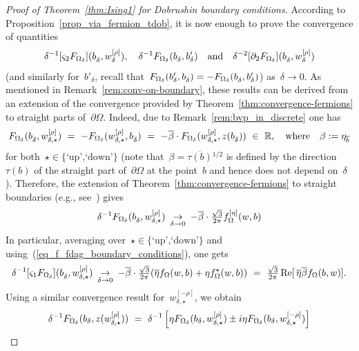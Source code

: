 \documentclass[reqno,11pt,a4paper]{amsart}
\theoremstyle{remark}
\newcommand{\R}{\mathbb{R}}
\newcommand{\weta}{w^{\left[\eta \right]}}
\newcommand{\wrho}{w^{\left[\rho \right]}}
\newcommand{\wmrho}{w^{\left[-\rho \right]}}
\newcommand{\feta}{f_{\Omega}^{[\eta]}}
\newcommand{\f}{f_{\Omega}}
\newcommand{\fstar}{f_{\Omega}^\star}
\newcommand{\dOne}{\partial_1}
\newcommand{\dTwo}{\partial_2}
\newcommand{\sOne}{\varsigma_1}
\newcommand{\sTwo}{\varsigma_2}
\renewcommand\Re{\operatorname{Re}}
\begin{document}
\begin{proof}[Proof of Theorem~\ref{thm:Ising1} for Dobrushin boundary conditions] According to Proposition~\ref{prop_via_fermion_tdob}, it is now enough to prove the convergence of quantities
\[
\delta^{-1}[\sTwo\Fdelta](b_\delta^{\vphantom{\rho}},\wrho_\delta),\quad \delta^{-1}\Fdelta(b^{\vphantom{\prime}}_\delta,b'_\delta)\quad\text{and}\quad
\delta^{-2}[\dTwo\Fdelta](b_\delta^{\vphantom{\rho}},\wrho_\delta)%
\]
(and similarly for~$b'_\delta$, recall that~$F_{\Omega_\delta}(b'_\delta,b^{\vphantom{\prime}}_\delta)=-F_{\Omega_\delta}(b^{\vphantom{\prime}}_\delta,b'_\delta)$) as~$\delta\to 0$. As mentioned in Remark~\ref{rem:conv-on-boundary}, these results can be derived from an extension of the convergence provided by Theorem~\ref{thm:convergence-fermions} to straight parts of~$\partial\Omega$. Indeed, due to Remark~\ref{rem:bvp_in_discrete} one has
\[
\Fdelta(b_\delta^{\vphantom{\rho}},\wrho_{\delta,\star})~=~ -\Fdelta(\wrho_{\delta,\star},b_\delta^{\vphantom{\rho}})~=~-\overline{\beta}\cdot \Fdelta(\wrho_{\delta,\star},z(b_\delta^{\vphantom{\rho}}))~\in~\R, \quad \text{where}\quad \beta:=\eta_{\overline{b}}
\]
for both~$\star\in\{\text{`up',`down'}\}$ (note that~$\beta=\overline{\tau(b)}{}^{1/2}$ is defined by the direction~$\tau(b)$ of the straight part of~$\partial\Omega$ at the point~$b$ and hence does not depend on~$\delta$). Therefore, the extension of Theorem~\ref{thm:convergence-fermions} to straight boundaries (e.g., see~\cite[Lemma~4.8]{CheIzy13}) gives
\[
\delta^{-1}\Fdelta(b_\delta^{\vphantom{\rho}},\wrho_{\delta,\star})~\mathop{\to}_{\delta\to 0}~-\overline{\beta}\cdot \tfrac{\sqrt{3}}{2\pi}\feta(w,b)
\]
In particular, averaging over~$\star\in\{\text{`up',`down'}\}$ and using~(\ref{eq_f_fdag_boundary_conditions}), one gets
\begin{equation}
\delta^{-1}[\sOne\Fdelta](b_\delta^{\vphantom{\rho}},\wrho_{\delta,\star})~\mathop{\to}_{\delta\to 0}~
  -\overline{\beta}\cdot \tfrac{\sqrt{3}}{2\pi}(\overline{\eta}\f(w,b)+\eta\fstar(w,b))~=~\tfrac{\sqrt{3}}{2\pi}\Re[\,\overline{\eta}\overline{\beta}\f(b,w)].
\label{eq_x_conv_Tdob-one}
\end{equation}
Using a similar convergence result for~$\wmrho_{\delta,\star}$, %
we obtain
\begin{align}
\delta^{-1}\Fdelta(b_\delta,z(\wrho_{\delta,\star})) ~&=~ \delta^{-1}\left[\eta\Fdelta(b_\delta,\wrho_{\delta,\star})\pm i\eta\Fdelta(b_\delta,\wmrho_{\delta,\star})\right] \notag \\

\end{align}
\end{proof}
\end{document}
